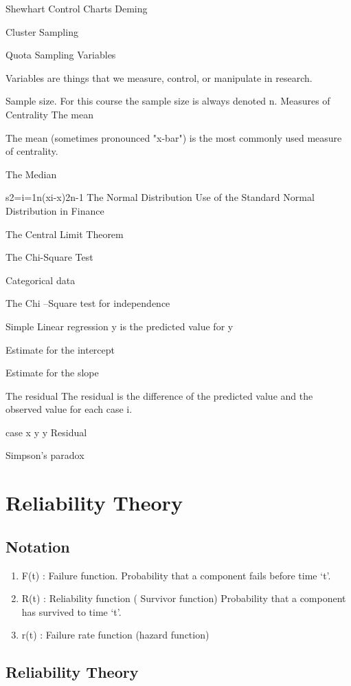 Shewhart Control Charts
Deming

Cluster Sampling

Quota Sampling
Variables

Variables are things that we measure, control, or manipulate in research.


Sample size.
For this course the sample size is always denoted n.
Measures of Centrality
The mean 

The mean (sometimes pronounced "x-bar") is the most commonly used measure of centrality.

The Median


s2=i=1n(xi-x)2n-1
The Normal Distribution
Use of the Standard Normal Distribution in Finance



The Central Limit Theorem




The Chi-Square Test
 
Categorical data
 
The Chi –Square test for independence
 
Simple Linear regression
y is the predicted value for y 


Estimate for the intercept

Estimate for the slope

The residual
The residual is the difference of the predicted value and the observed value for each case i.

case
x
y
y
Residual

Simpson's paradox
\chapter{Reliability Theory}

\section{Notation}\begin{enumerate}
	\item
	F(t) : Failure function. Probability that a component fails
	before time `t'.
	\item R(t) : Reliability function ( Survivor function) Probability that a component
	has survived to time `t'.
	\item r(t) : Failure rate function (hazard function)
\end{enumerate}

\section{Reliability Theory}

